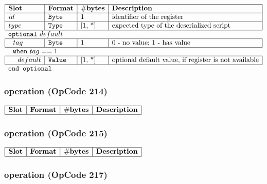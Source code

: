 \noindent
\(\begin{array}{| l | l | l | l |}
    \hline
    \bf{Slot} & \bf{Format} & \bf{\#bytes} & \bf{Description} \\
    \hline
         id & \lst{Byte} & \text{1} & \text{identifier of the register} \\
    \hline
           type & \lst{Type} & \text{[1, *]} & \text{expected type of the deserialized script} \\
    \hline
          \multicolumn{4}{l}{\lst{optional}~default} \\
    \hline
    ~~tag & \lst{Byte} & 1 & \text{0 - no value; 1 - has value} \\
    \hline
    \multicolumn{4}{l}{~~\lst{when}~tag == 1} \\
    \hline
             ~~~~ default & \lst{Value} & \text{[1, *]} & \text{optional default value, if register is not available} \\
    \hline
          \multicolumn{4}{l}{\lst{end optional}} \\
\end{array}\)
       

\subsubsection{ operation (OpCode 214)}

\noindent
\(\begin{array}{| l | l | l | l |}
    \hline
    \bf{Slot} & \bf{Format} & \bf{\#bytes} & \bf{Description} \\
    \hline

\end{array}\)
       

\subsubsection{ operation (OpCode 215)}

\noindent
\(\begin{array}{| l | l | l | l |}
    \hline
    \bf{Slot} & \bf{Format} & \bf{\#bytes} & \bf{Description} \\
    \hline

\end{array}\)
       

\subsubsection{ operation (OpCode 217)}

